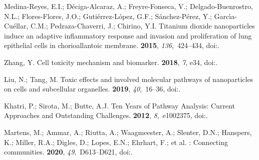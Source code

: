 \documentclass[ijms,article,accept,moreauthors,pdftex]{Definitions/mdpi}
\begin{document}
\begin{thebibliography}{999}
Medina-Reyes, E.I.; D{\'{e}}ciga-Alcaraz, A.; Freyre-Fonseca, V.;
  Delgado-Buenrostro, N.L.; Flores-Flores, J.O.; Guti{\'{e}}rrez-L{\'{o}}pez,
  G.F.; S{\'{a}}nchez-P{\'{e}}rez, Y.; Garc{\'{\i}}a-Cu{\'{e}}llar, C.M.;
  Pedraza-Chaverri, J.; Chirino, Y.I.
\newblock Titanium dioxide nanoparticles induce an adaptive inflammatory
  response and invasion and proliferation of lung epithelial cells in
  chorioallantoic membrane.
 {\bf 2015}, {\em 136},~424--434,
\newblock
  doi:{\href{https://doi.org/10.1016/j.envres.2014.10.016}{}}.

Zhang, Y.
\newblock Cell toxicity mechanism and biomarker.
 {\bf 2018}, {\em 7},  e34, 
\newblock
  doi:{\href{https://doi.org/10.1186/s40169-018-0212-7}{}}.

Liu, N.; Tang, M.
\newblock Toxic effects and involved molecular pathways of nanoparticles on
  cells and subcellular organelles.
 {\bf 2019}, {\em 40},~16--36,
\newblock
  doi:{\href{https://doi.org/10.1002/jat.3817}{}}.

Khatri, P.; Sirota, M.; Butte, A.J.
\newblock Ten Years of Pathway Analysis: Current Approaches and Outstanding
  Challenges.
 {\bf 2012}, {\em 8},~e1002375,
\newblock
  doi:{\href{https://doi.org/10.1371/journal.pcbi.1002375}{}}.

Martens, M.; Ammar, A.; Riutta, A.; Waagmeester, A.; Slenter, D.N.; Hanspers,
  K.; Miller, R.A.; Digles, D.; Lopes, E.N.; Ehrhart, F.; et al.
: Connecting communities.
 {\bf 2020}, {\em 49},~D613--D621,
\newblock
  doi:{\href{https://doi.org/10.1093/nar/gkaa1024}{}}.


\end{thebibliography}
\end{document}
